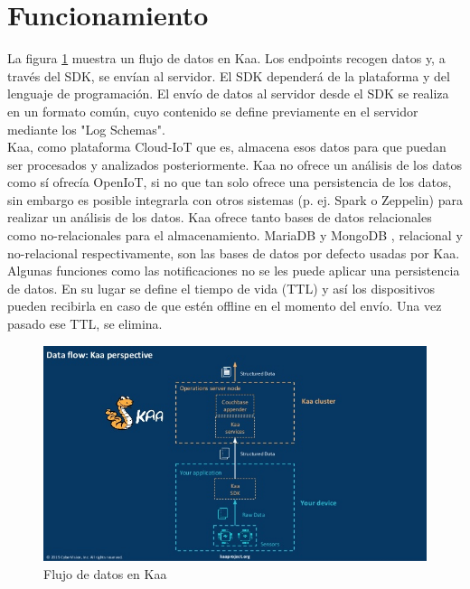 \documentclass[12pt, twoside]{book}
\begin{document}
\section{Funcionamiento}
La figura \ref{flujo_kaa} muestra un flujo de datos en Kaa. Los endpoints recogen datos y, a través del SDK, se envían al servidor. El SDK dependerá de la plataforma y del lenguaje de programación. El envío de datos al servidor desde el SDK se realiza en un formato común, cuyo contenido se define previamente en el servidor mediante los "Log Schemas". \\
Kaa, como plataforma Cloud-IoT que es, almacena esos datos para que puedan ser procesados y analizados posteriormente. Kaa no ofrece un análisis de los datos como sí ofrecía OpenIoT, si no que tan solo ofrece una persistencia de los datos, sin embargo es posible integrarla con otros sistemas (p. ej. Spark o Zeppelin) para realizar un análisis de los datos. Kaa ofrece tanto bases de datos relacionales como no-relacionales para el almacenamiento. MariaDB y MongoDB , relacional y no-relacional respectivamente, son las bases de datos por defecto usadas por Kaa. Algunas funciones como las notificaciones no se les puede aplicar una persistencia de datos. En su lugar se define el tiempo de vida (TTL) y así los dispositivos pueden recibirla en caso de que estén offline en el momento del envío. Una vez pasado ese TTL, se elimina. 
\begin{figure}[H]
\centering
\includegraphics[scale=0.4]{images/kaa_platform1}
\caption{Flujo de datos en Kaa}\label{flujo_kaa}
\end{figure} 
\end{document}
